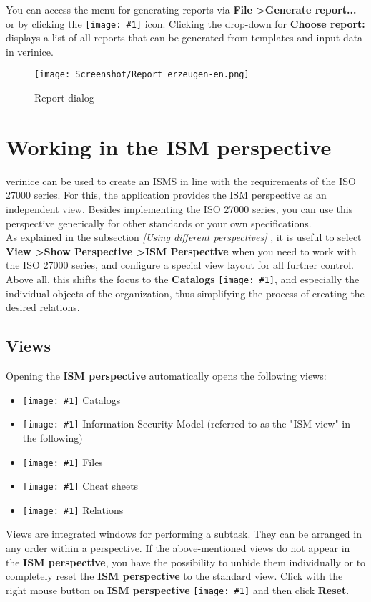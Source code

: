 \documentclass[a4paper,10pt]{book}
\newcommand{\icon}[1]{\texttt{[image: \#1]}}
\begin{document}
 You can access the menu for generating reports via \textbf{File \textgreater Generate report...}
 or by clicking the \icon{Icon/Report.png} icon. Clicking the drop-down for
 \textbf{Choose report:} displays a list of all reports that can be generated from templates and input data in verinice.
\begin{figure}[htb!]
  \centering
  \texttt{[image: Screenshot/Report\_erzeugen-en.png]}
  \caption{\label {Report view} Report dialog}
\end{figure}
\newline


\chapter{Working in the ISM perspective} \label{Working in the ISM perspective}
verinice can be used to create an ISMS in line with the requirements of the ISO 27000 series. For this,
the application provides the ISM perspective as an independent view. Besides implementing the ISO 27000
series, you can use this perspective generically for other standards or your own specifications.
\newline\\
As explained in the subsection {\em \ref{Using different perspectives}  },
it is useful to select \textbf{View \textgreater Show Perspective \textgreater ISM Perspective}
when you need to work with the ISO 27000 series, and configure a special view layout for all further control.
Above all, this shifts the focus to the \textbf{Catalogs} \icon{Icon/bp_catalog},
and especially the individual objects of the organization, thus simplifying the process of creating the desired
relations.

\section{Views}
Opening the \textbf{ISM perspective} automatically opens the following views:
\begin{itemize}
\item \icon{Icon/bp_catalog} Catalogs
\item \icon{Icon/Informationssicherheitsmodell.png} Information Security Model (referred to as the "ISM view" in the following)
\item \icon{Icon/Hinzufuegen.png} Files
\item \icon{Icon/Cheatsheet_view.png} Cheat sheets
\item \icon{Icon/Verknuepfungen.png} Relations
\end{itemize}
Views are integrated windows for performing a subtask. They can be arranged in any order within a perspective. If the above-mentioned views do not appear in the \textbf{ISM perspective}, you have the possibility to unhide them individually or to completely reset the \textbf{ISM perspective} to the standard view. Click with the right mouse button on \textbf{ISM perspective}
 \icon{Icon/Informationssicherheitsmodell.png} and then click \textbf{Reset}.
\end{document}
